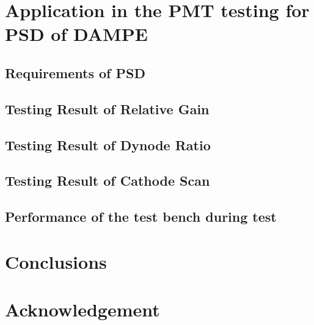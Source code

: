 \documentclass[5p, times]{elsarticle}
\begin{document}
\section{Application in the PMT testing for PSD of DAMPE}
\label{sec:application}


\subsection{Requirements of PSD}
\label{sec:psd_requirements}

\subsection{Testing Result of Relative Gain}
\label{sec:psd_gain}

\subsection{Testing Result of Dynode Ratio}
\label{sec:psd_dy58}

\subsection{Testing Result of Cathode Scan}
\label{sec:psd_cathodescan}

\subsection{Performance of the test bench during test}
\label{sec:performance}

\section{Conclusions}
\label{sec:conclustions}

\section*{Acknowledgement}

\appendix
\section{}
\label{app:}
\end{document}
